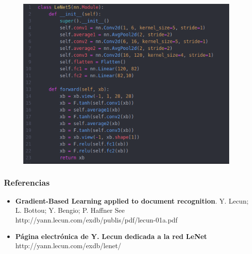 \documentclass[xcolor=dvipsnames, compress]{beamer}
\begin{document}
\begin{frame}


	\begin{figure}
	\includegraphics[scale=0.5]{images/lenet.png}
\end{figure}

\end{frame}

\begin{frame}
\frametitle{Referencias}

\begin{itemize}
	\item \textbf{Gradient-Based Learning applied to document recognition}.  Y. Lecun; L. Bottou; Y. Bengio; P. Haffner See http://yann.lecun.com/exdb/publis/pdf/lecun-01a.pdf
	
	\item \textbf{Página electrónica de Y. Lecun dedicada a la red LeNet} http://yann.lecun.com/exdb/lenet/
\end{itemize}

\end{frame}


%
 
\end{document}
